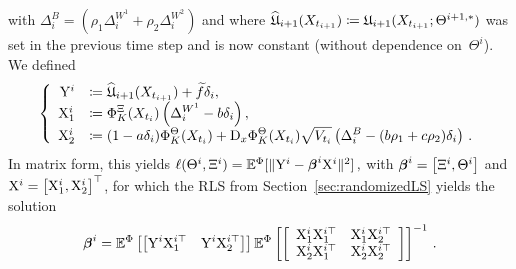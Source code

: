 with $\Delta^{B}_{i}=(\rho_1\Delta^{W^1}_{i} + \rho_2\Delta^{W^2}_{i})$ and where $\widehat{\mathfrak{U}}_{i+1}(X_{t_{i+1}})\coloneqq \mathfrak{U}_{i+1}(X_{t_{i+1}}; \Theta^{i+1,*})$ was set in the previous time step and is now constant (without dependence on~$\Theta^i$). We defined
\begin{equation}\label{eq:SystemNonMark}
\left\{
\begin{array}{rl}
\mathrm{Y}^i & \coloneqq  \displaystyle \widehat{\mathfrak{U}}_{i+1}(X_{t_{i+1}}) + \widetilde{f}\delta_{i} , \\
     \mathrm{X}_1^i &\coloneqq  \displaystyle \Phi_K^\Xi(X_{t_i})\left(\Delta^{W^1}_{i}-b\delta_{i} \right), \\ 
    \mathrm{X}_2^i &\coloneqq  \displaystyle (1-a\delta_{i} )\Phi_K^\Theta(X_{t_i}) + \mathrm{D}_{x}\Phi_K^\Theta(X_{t_i})
    \sqrt{V_{t_i}}\left(\Delta^{B}_{i}-(b\rho_1 + c\rho_2)\delta_{i} \right)\,.
\end{array}
\right.
\end{equation}
In matrix form, this yields
$\ell(\Theta^i, \Xi^i) = \mathbb{E}^\Phi[\|\mathrm{Y}^i - \boldsymbol{\beta}^i\mathrm{X}^i\|^2]\,,$ with $\boldsymbol{\beta}^i=\begin{bmatrix}\Xi^i, \Theta^i\end{bmatrix}$
and
$\mathrm{X}^i= \begin{bmatrix}\mathrm{X}_1^i, \mathrm{X}_2^i\end{bmatrix}^{\top}$,
for which the RLS from Section~\ref{sec:randomizedLS}
yields the solution
\begin{equation}\label{eq:betaestimator}
    \boldsymbol{\beta}^i = \mathbb{E}^\Phi\left[
    \left[\mathrm{Y}^i\mathrm{X}_1^{i\top} \quad \mathrm{Y}^i\mathrm{X}_2^{i\top}\right] \right]
    \mathbb{E}^\Phi\left[
    \left[\begin{array}{cc}
         \mathrm{X}_1^i\mathrm{X}_1^{i\top} & \mathrm{X}_1^i\mathrm{X}_2^{i\top} \\
         \mathrm{X}_2^i\mathrm{X}_1^{i\top} & \mathrm{X}_2^i\mathrm{X}_2^{i\top}
    \end{array}\right]\right]^{-1}\,.
\end{equation}



